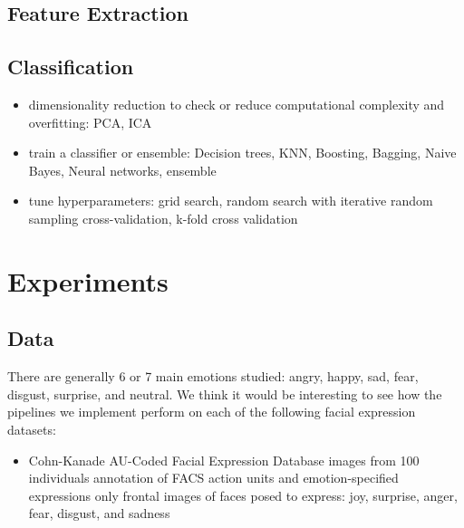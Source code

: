 \documentclass[10pt,twocolumn,letterpaper]{article}
\begin{document}
\subsection{Feature Extraction}

\subsection{Classification}
\begin{itemize}
\item dimensionality reduction to check or reduce computational complexity and overfitting:
\subitem PCA, ICA
\item train a classifier or ensemble: 
\subitem Decision trees, KNN, Boosting, Bagging, Naive Bayes, Neural networks, ensemble 
\item tune hyperparameters:
\subitem grid search, random search with iterative random sampling cross-validation, k-fold cross validation
\end{itemize}

\section{Experiments} 

\subsection{Data}
There are generally 6 or 7 main emotions studied: angry, happy, sad, fear, disgust, surprise, and neutral. We think it would be interesting to see how the pipelines we implement perform on each of the following facial expression datasets:
\begin{itemize}
\item Cohn-Kanade AU-Coded Facial Expression Database \cite{ck}
 images from 100 individuals
\subitem annotation of FACS action units and emotion-specified expressions
\subitem only frontal images of faces posed to express: joy, surprise, anger, fear, disgust, and sadness
\end{itemize}
\end{document}
